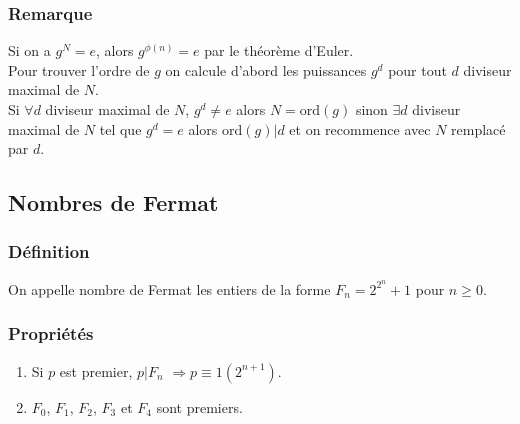 \documentclass[a4paper,10pt]{book} %
\newcommand{\ord}{\mathrm{ord}}
\begin{document}
\subsubsection{Remarque}
Si on a $g^N=e$, alors $g^{\phi(n)}=e$ par le théorème d'Euler.\\

Pour trouver l'ordre de $g$ on calcule d'abord les puissances $g^d$ pour tout $d$ diviseur maximal de $N$.\\

Si $\forall d$ diviseur maximal de $N$, $g^d\neq e$ alors $N=\ord(g)$
sinon $\exists d$ diviseur maximal de $N$ tel que $g^d=e$ alors $\ord(g)|d$
et on recommence avec $N$ remplacé par $d$.

\newpage

\subsection{Nombres de Fermat}
\subsubsection{Définition}
On appelle nombre de Fermat les entiers de la forme $F_n = 2^{2^{n}} +1$ pour $n\geq 0$.

\subsubsection{Propriétés}
\begin{enumerate}
\item \label{exemple1Fermat}Si $p$ est premier, $p|F_n$ $\Rightarrow p \equiv 1(2^{n+1})$.
\item $F_0$, $F_1$, $F_2$, $F_3$ et $F_4$ sont premiers.
\end{enumerate}
\end{document}
